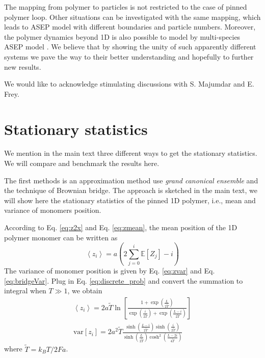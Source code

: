 \documentclass[aps,showpacs,twocolumn,floatfix,prx,superscriptaddress]{revtex4-1}
\begin{document}
The mapping from polymer to particles is not restricted to the case of pinned polymer loop. Other situations can be investigated with the same mapping, which leads to ASEP model with different boundaries and particle numbers. Moreover, the polymer dynamics beyond 1D is also possible to
model by multi-species ASEP model \cite{}. We believe that by showing the unity of such apparently different systems we pave the way to their better understanding and hopefully to further new results.
\begin{acknowledgments}
We would like to acknowledge stimulating discussions with S. Majumdar and E. Frey.\end{acknowledgments}


\appendix


\section{Stationary statistics}
\label{sec:stationary_statistics}
We mention in the main text three different ways to get the stationary statistics. We will compare and benchmark the results here.

The first methods is an approximation method use \emph{grand canonical ensemble} and the technique of Brownian bridge. The approach is sketched in the main text, we will show here the stationary statistics of the pinned 1D polymer, i.e., mean and variance of monomers position.

According to Eq. \eqref{eq:z2x} and Eq. \eqref{eq:zmean}, the mean position of the 1D polymer monomer can be written as 
\begin{equation}
    \label{eq:polymerMeanPos}
    \left< z_i \right> = a \left( 2 \sum_{j=0}^i \mathbb{E}\left[Z_j\right] - i \right)
\end{equation}
The variance of monomer position is given by Eq. \eqref{eq:zvar} and Eq. \eqref{eq:bridgeVar}. Plug in Eq. \eqref{eq:discrete_prob} and convert the summation to integral when $T\gg 1$, we obtain
\begin{subequations}
    \label{eq:meanVarPolymerPos}
    \begin{eqnarray}
        \left< z_i \right> = 2 a \tilde{T} \ln\left[ \frac{1+\exp\left(\frac{L}{2\tilde{T}}\right)}{\exp\left(\frac{i}{2\tilde{T}}\right) + \exp\left(\frac{L-i}{2\tilde{T}}\right)} \right] \\
        \text{var}\left[z_i\right] = 2 a^2 \tilde{T} \frac{ \sinh\left( \frac{L-i}{2\tilde{T}}\right) \sinh\left( \frac{i}{2\tilde{T}}\right)} {\sinh\left( \frac{L}{2\tilde{T}}\right) \cosh^2\left( \frac{L-2i}{4\tilde{T}}\right)}
    \end{eqnarray}
\end{subequations}
where $\tilde{T} = k_B T / 2Fa$. 
\end{document}
